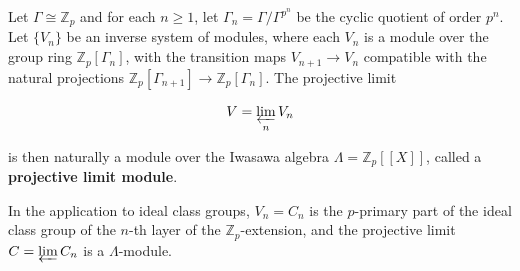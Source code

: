Let $\Gamma \cong \mathbb{Z}_p$ and for each $n \geq 1$, let $\Gamma_n = \Gamma/\Gamma^{p^n}$ be the cyclic quotient of order $p^n$. Let $\{V_n\}$ be an inverse system of modules, where each $V_n$ is a module over the group ring $\mathbb{Z}_p[\Gamma_n]$, with the transition maps $V_{n+1} \to V_n$ compatible with the natural projections $\mathbb{Z}_p[\Gamma_{n+1}] \to \mathbb{Z}_p[\Gamma_n]$. The projective limit

$$V = \varprojlim_n V_n$$

is then naturally a module over the Iwasawa algebra $\Lambda = \mathbb{Z}_p[[X]]$, called a \textbf{projective limit module}.

In the application to ideal class groups, $V_n = C_n$ is the $p$-primary part of the ideal class group of the $n$-th layer of the $\mathbb{Z}_p$-extension, and the projective limit $C = \varprojlim C_n$ is a $\Lambda$-module.

